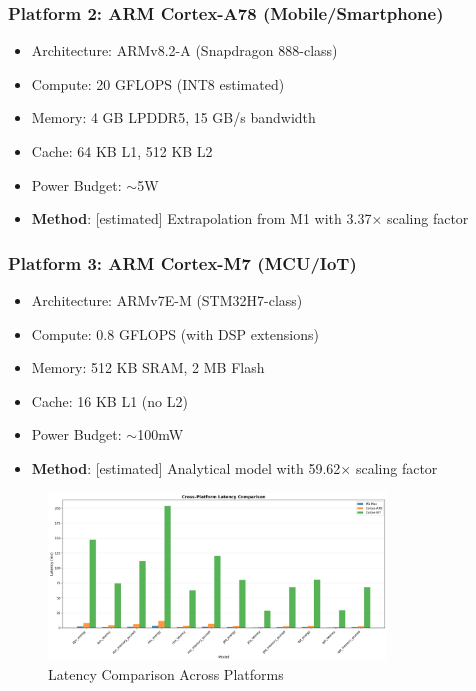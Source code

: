 \documentclass[10pt, a4paper]{article}
\begin{document}
\subsubsection{Platform 2: ARM Cortex-A78 (Mobile/Smartphone)}
\begin{itemize}
    \item Architecture: ARMv8.2-A (Snapdragon 888-class)
    \item Compute: 20 GFLOPS (INT8 estimated)
    \item Memory: 4 GB LPDDR5, 15 GB/s bandwidth
    \item Cache: 64 KB L1, 512 KB L2
    \item Power Budget: $\sim$5W
    \item \textbf{Method}: [estimated] Extrapolation from M1 with 3.37× scaling factor
\end{itemize}

\subsubsection{Platform 3: ARM Cortex-M7 (MCU/IoT)}
\begin{itemize}
    \item Architecture: ARMv7E-M (STM32H7-class)
    \item Compute: 0.8 GFLOPS (with DSP extensions)
    \item Memory: 512 KB SRAM, 2 MB Flash
    \item Cache: 16 KB L1 (no L2)
    \item Power Budget: $\sim$100mW
    \item \textbf{Method}: [estimated] Analytical model with 59.62× scaling factor
\end{itemize}

\begin{figure}[H]
\centering
\includegraphics[width=0.8\textwidth]{charts/part3_latency_comparison.png}
\caption{Latency Comparison Across Platforms}
\end{figure}
\end{document}
